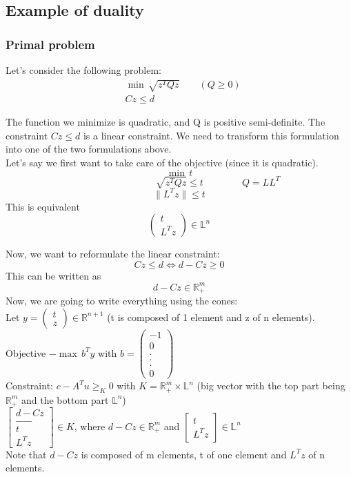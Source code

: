\subsection{Example of duality}
\begin{leftbar}
\subsubsection{Primal problem}
Let's consider the following problem: 
\begin{align*}
&\min \, \sqrt{z^TQz} \qquad (Q\geq 0)\\
&Cz \leq d
\end{align*}

The function we minimize is quadratic, and Q is positive semi-definite. The constraint $Cz \leq d$ is a linear constraint. We need to transform this formulation into one of the two formulations above. \\
Let's say we first want to take care of the objective (since it is quadratic). 
$$\min \, t$$
$$\qquad \qquad \qquad \qquad \sqrt{z^TQz}\leq t \qquad \qquad Q=LL^T$$
$$\parallel L^Tz \parallel \leq t$$
This is equivalent 
$$\begin{pmatrix}
t\\
L^Tz
\end{pmatrix} \in \mathbb{L}^n$$

Now, we want to reformulate the linear constraint: 
$$Cz\leq d \Longleftrightarrow d-Cz \geq 0$$
This can be written as 
$$d-Cz \in \mathbb{R}^m_+$$
Now, we are going to write everything using the cones: \\
Let $y=\begin{pmatrix}
t\\
z
\end{pmatrix} \in \mathbb{R}^{n+1}$ (t is composed of 1 element and z of n elements). \\
Objective $-\max \, b^Ty$ with $b=\begin{pmatrix}
-1\\
0\\
. \\
. \\
. \\
0
\end{pmatrix}$\\
Constraint: $c-A^Tu \geq_K 0 $ with $K= \mathbb{R}^m_+ \times \mathbb{L}^n$ (big vector with the top part being $\mathbb{R}^m_+$ and the bottom part $\mathbb{L}^n$)\\

$\begin{bmatrix}
d-Cz\\
\_ \_ \_ \_ \_ \\
t\\
L^Tz
\end{bmatrix} \in K$, where $d-Cz \in \mathbb{R}^m_+$ and $\begin{bmatrix}
t\\
L^Tz
\end{bmatrix} \in \mathbb{L}^n$\\
Note that $d-Cz$ is composed of m elements, t of one element and $L^Tz$ of n elements. \\


\end{leftbar}
